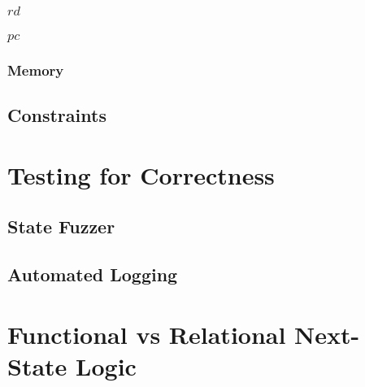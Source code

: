 \subsubsection{$rd$}
\subsubsection{$pc$}
\subsubsection{Memory}
\subsection{Constraints}
\section{Testing for Correctness}\label{sec:corectness}
\subsection{State Fuzzer}
\subsection{Automated Logging}

\section{Functional vs Relational Next-State Logic}\label{sec:funcVSrel}